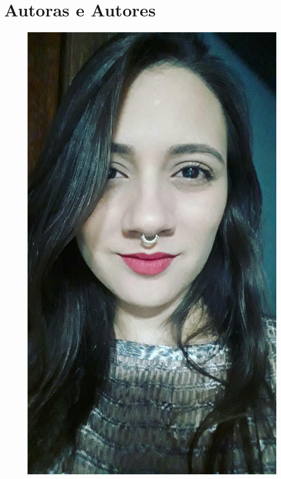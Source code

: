 \chapter*{Autoras e Autores}
\begin{figure}
    \includegraphics[width=0.2\paperwidth]{autoras/amandamorais.jpg}
\end{figure}

